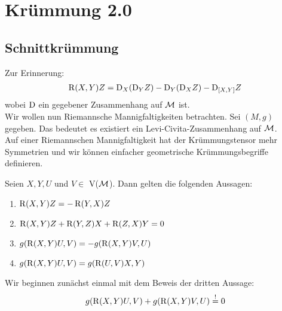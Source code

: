 \chapter{Krümmung 2.0}
\section{Schnittkrümmung}
Zur Erinnerung:
\begin{align}
	\operatorname{R}(X,Y)Z = \mathrm{D}_X(\mathrm{D}_YZ)-\mathrm{D}_Y(\mathrm{D}_XZ)-\mathrm{D}_{[X,Y]}Z
\end{align}
wobei $\mathrm{D}$ ein gegebener Zusammenhang auf $\mathcal{M}$ ist. \\
Wir wollen nun Riemannsche Mannigfaltigkeiten betrachten. Sei $(M,g)$ gegeben. Das bedeutet es existiert ein Levi-Civita-Zusammenhang auf $\mathcal{M}$. \\
Auf einer Riemannschen Mannigfaltigkeit hat der Krümmungstensor mehr Symmetrien und wir können einfacher geometrische Krümmungsbegriffe definieren.
\begin{satz}
Seien $X, Y, U$ und $V \in $ V($\mathcal{M}$).
Dann gelten die folgenden Aussagen:	
\begin{enumerate}
	\item $\operatorname{R}(X,Y)Z = -\operatorname{R}(Y,X)Z$
	\item $\operatorname{R}(X,Y)Z +\operatorname{R}(Y,Z)X+\operatorname{R}(Z,X)Y = 0$
	\item $g(\operatorname{R}(X,Y)U,V)=-g(\operatorname{R}(X,Y)V,U)$
	\item $g(\operatorname{R}(X,Y)U,V)=g(\operatorname{R}(U,V)X,Y)$
\end{enumerate}
\end{satz}
\begin{bew}
Wir beginnen zunächst einmal mit dem Beweis der dritten Aussage:
\begin{align*}	
g(\operatorname{R}(X,Y)U,V)+g(\operatorname{R}(X,Y)V,U) \overset{!}{=} 0
\end{align*}
\end{bew}

